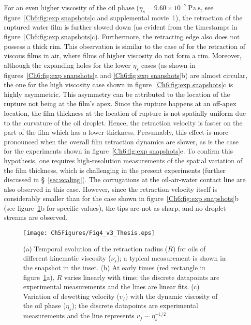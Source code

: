 For an even higher viscosity of the oil phase ($\eta_{s} = 9.60 \times 10^{-2}\,\si{\pascal}.\si{\second}$, see figure~\ref{Ch6:fig:exp snapshots}c and supplemental movie~{\color{Myfig}1}), the retraction of the ruptured water film is further slowed down (as evident from the timestamps in figure~\ref{Ch6:fig:exp snapshots}c). Furthermore, the retracting edge also does not possess a thick rim. This observation is similar to the case of \citet{brenner-1999-pof} for the retraction of viscous films in air, where films of higher viscosity do not form a rim. Moreover, although the expanding holes for the lower $\eta_{s}$ cases (as shown in figures~\ref{Ch6:fig:exp snapshots}a and \ref{Ch6:fig:exp snapshots}b) are almost circular, the one for the high viscosity case shown in figure~\ref{Ch6:fig:exp snapshots}c is highly asymmetric. This asymmetry can be attributed to the location of the rupture not being at the film's apex. Since the rupture happens at an off-apex location, the film thickness at the location of rupture is not spatially uniform due to the curvature of the oil droplet. Hence, the retraction velocity is faster on the part of the film which has a lower thickness. Presumably, this effect is more pronounced when the overall film retraction dynamics are slower, as is the case for the experiments shown in figure~\ref{Ch6:fig:exp snapshots}c. To confirm this hypothesis, one requires high-resolution measurements of the spatial variation of the film thickness, which is challenging in the present experiments (further discussed in \S~\ref{sec:scaling}). The corrugations at the oil-air-water contact line are also observed in this case. However, since the retraction velocity itself is considerably smaller than for the case shown in figure~\ref{Ch6:fig:exp snapshots}b (see figure~\ref{Ch6:fig:dynamics}b for specific values), the tips are not as sharp, and no droplet streams are observed. 

\begin{figure}
	\centering
	\texttt{[image: Ch5Figures/Fig4\_v3\_Thesis.eps]}
	\caption{(a) Temporal evolution of the retraction radius ($R$) for oils of different kinematic viscosity ($\nu_{s}$); a typical measurement is shown in the snapshot in the inset. (b) At early times (red rectangle in figure~\ref{Ch6:fig:dynamics}a), $R$ varies linearly with time; the discrete datapoints are experimental measurements and the lines are linear fits. (c) Variation of dewetting velocity ($v_f$) with the dynamic viscosity of the oil phase ($\eta_{s}$); the discrete datapoints are experimental measurements and the line represents $v_f \sim \eta_{s}^{-1/2}$.}
	\label{Ch6:fig:dynamics}
\end{figure}

